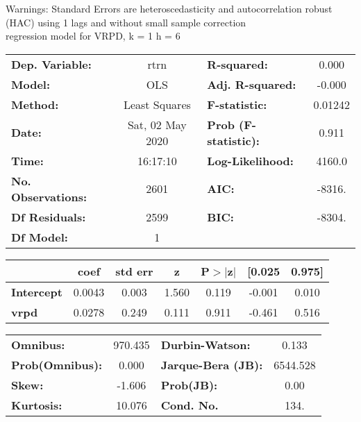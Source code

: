 Warnings: \newline
 [1] Standard Errors are heteroscedasticity and autocorrelation robust (HAC) using 1 lags and without small sample correction\\ 

regression model for VRPD, k = 1 h = 6\begin{center}
\begin{tabular}{lclc}
\toprule
\textbf{Dep. Variable:}    &       rtrn       & \textbf{  R-squared:         } &     0.000   \\
\textbf{Model:}            &       OLS        & \textbf{  Adj. R-squared:    } &    -0.000   \\
\textbf{Method:}           &  Least Squares   & \textbf{  F-statistic:       } &   0.01242   \\
\textbf{Date:}             & Sat, 02 May 2020 & \textbf{  Prob (F-statistic):} &    0.911    \\
\textbf{Time:}             &     16:17:10     & \textbf{  Log-Likelihood:    } &    4160.0   \\
\textbf{No. Observations:} &        2601      & \textbf{  AIC:               } &    -8316.   \\
\textbf{Df Residuals:}     &        2599      & \textbf{  BIC:               } &    -8304.   \\
\textbf{Df Model:}         &           1      & \textbf{                     } &             \\
\bottomrule
\end{tabular}
\begin{tabular}{lcccccc}
                   & \textbf{coef} & \textbf{std err} & \textbf{z} & \textbf{P$> |$z$|$} & \textbf{[0.025} & \textbf{0.975]}  \\
\midrule
\textbf{Intercept} &       0.0043  &        0.003     &     1.560  &         0.119        &       -0.001    &        0.010     \\
\textbf{vrpd}      &       0.0278  &        0.249     &     0.111  &         0.911        &       -0.461    &        0.516     \\
\bottomrule
\end{tabular}
\begin{tabular}{lclc}
\textbf{Omnibus:}       & 970.435 & \textbf{  Durbin-Watson:     } &    0.133  \\
\textbf{Prob(Omnibus):} &   0.000 & \textbf{  Jarque-Bera (JB):  } & 6544.528  \\
\textbf{Skew:}          &  -1.606 & \textbf{  Prob(JB):          } &     0.00  \\
\textbf{Kurtosis:}      &  10.076 & \textbf{  Cond. No.          } &     134.  \\
\bottomrule
\end{tabular}
\end{center}

